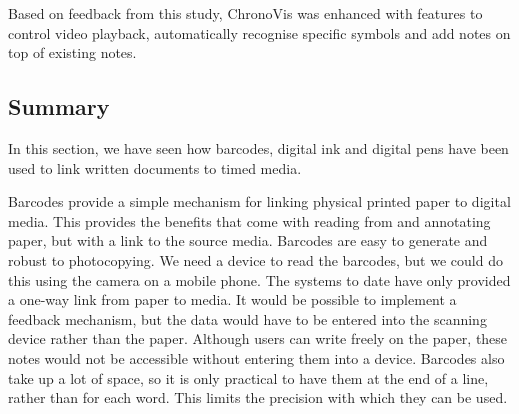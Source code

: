 Based on feedback from this study, ChronoVis was enhanced with features to control video playback, automatically
recognise specific symbols and add notes on top of existing notes.






\subsection{Summary}

In this section, we have seen how barcodes, digital ink and digital pens have been used to link written documents to
timed media.

Barcodes provide a simple mechanism for linking physical printed paper to digital media. This provides the benefits
that come with reading from and annotating paper, but with a link to the source media. Barcodes are easy to generate
and robust to photocopying.  We need a device to read the barcodes, but we could do this using the camera on a mobile
phone.  The systems to date have only provided a one-way link from paper to media.  It would be possible to implement a
feedback mechanism, but the data would have to be entered into the scanning device rather than the paper. Although
users can write freely on the paper, these notes would not be accessible without entering them into a device. Barcodes
also take up a lot of space, so it is only practical to have them at the end of a line, rather than for each word. This
limits the precision with which they can be used.

